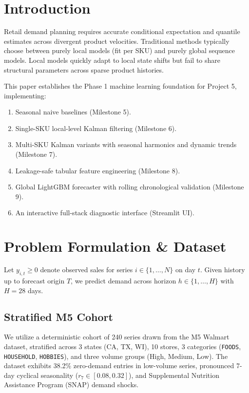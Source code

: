 \documentclass[conference]{IEEEtran}
\begin{document}
\section{Introduction}
Retail demand planning requires accurate conditional expectation and quantile estimates across divergent product velocities. Traditional methods typically choose between purely local models (fit per SKU) and purely global sequence models. Local models quickly adapt to local state shifts but fail to share structural parameters across sparse product histories. 

This paper establishes the Phase 1 machine learning foundation for Project 5, implementing:
\begin{enumerate}
    \item Seasonal naive baselines (Milestone 5).
    \item Single-SKU local-level Kalman filtering (Milestone 6).
    \item Multi-SKU Kalman variants with seasonal harmonics and dynamic trends (Milestone 7).
    \item Leakage-safe tabular feature engineering (Milestone 8).
    \item Global LightGBM forecaster with rolling chronological validation (Milestone 9).
    \item An interactive full-stack diagnostic interface (Streamlit UI).
\end{enumerate}

\section{Problem Formulation \& Dataset}
Let $y_{i,t} \ge 0$ denote observed sales for series $i \in \{1,\dots,N\}$ on day $t$. Given history up to forecast origin $T$, we predict demand across horizon $h \in \{1,\dots,H\}$ with $H=28$ days.

\subsection{Stratified M5 Cohort}
We utilize a deterministic cohort of 240 series drawn from the M5 Walmart dataset, stratified across 3 states (CA, TX, WI), 10 stores, 3 categories (\texttt{FOODS}, \texttt{HOUSEHOLD}, \texttt{HOBBIES}), and three volume groups (High, Medium, Low). The dataset exhibits 38.2\% zero-demand entries in low-volume series, pronounced 7-day cyclical seasonality ($r_7 \in [0.08, 0.32]$), and Supplemental Nutrition Assistance Program (SNAP) demand shocks.
\end{document}
